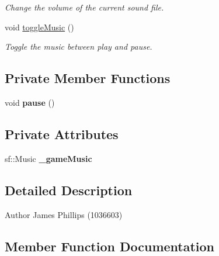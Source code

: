 \begin{DoxyCompactItemize}
\begin{DoxyCompactList}\small\item\em Change the volume of the current sound file. \end{DoxyCompactList}\item 
\mbox{\label{class_game_music_ac14197e5734c1934ca85666c14a7a1c3}} 
void \hyperlink{class_game_music_ac14197e5734c1934ca85666c14a7a1c3}{toggle\+Music} ()
\begin{DoxyCompactList}\small\item\em Toggle the music between play and pause. \end{DoxyCompactList}\end{DoxyCompactItemize}
\subsection*{Private Member Functions}
\begin{DoxyCompactItemize}
\item 
\mbox{\label{class_game_music_a763d190d8727abe9eb47acddc5cf0008}} 
void {\bfseries pause} ()
\end{DoxyCompactItemize}
\subsection*{Private Attributes}
\begin{DoxyCompactItemize}
\item 
\mbox{\label{class_game_music_a461fff6d2be45f65c7de7fdadcf0ae00}} 
sf\+::\+Music {\bfseries \+\_\+game\+Music}
\end{DoxyCompactItemize}


\subsection{Detailed Description}
\begin{DoxyAuthor}{Author}
James Phillips (1036603) 
\end{DoxyAuthor}


\subsection{Member Function Documentation}
\mbox{\label{class_game_music_adafedd8d8c1b98efbac108c8f8b826ac}} 
